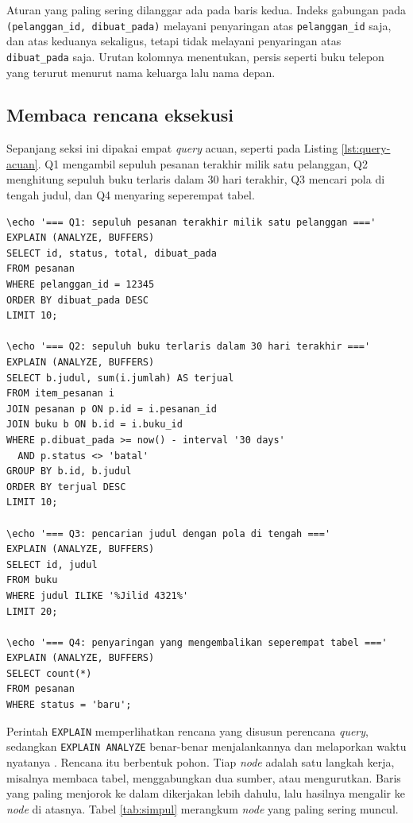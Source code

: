 Aturan yang paling sering dilanggar ada pada baris kedua. Indeks gabungan pada
\texttt{(pelanggan\_id, dibuat\_pada)} melayani penyaringan atas
\texttt{pelanggan\_id} saja, dan atas keduanya sekaligus, tetapi tidak melayani
penyaringan atas \texttt{dibuat\_pada} saja. Urutan kolomnya menentukan, persis
seperti buku telepon yang terurut menurut nama keluarga lalu nama depan.

\subsection*{Membaca rencana eksekusi}

Sepanjang seksi ini dipakai empat \textit{query} acuan, seperti pada Listing
\ref{lst:query-acuan}. Q1 mengambil sepuluh pesanan terakhir milik satu
pelanggan, Q2 menghitung sepuluh buku terlaris dalam 30 hari terakhir, Q3
mencari pola di tengah judul, dan Q4 menyaring seperempat tabel.

\begin{lstlisting}[style=SqlStyle, caption={Empat query acuan yang dipakai sepanjang bab ini, tersedia di \berkas{sources/chapter03/03-query-baseline.sql}}, label={lst:query-acuan}]
\echo '=== Q1: sepuluh pesanan terakhir milik satu pelanggan ==='
EXPLAIN (ANALYZE, BUFFERS)
SELECT id, status, total, dibuat_pada
FROM pesanan
WHERE pelanggan_id = 12345
ORDER BY dibuat_pada DESC
LIMIT 10;

\echo '=== Q2: sepuluh buku terlaris dalam 30 hari terakhir ==='
EXPLAIN (ANALYZE, BUFFERS)
SELECT b.judul, sum(i.jumlah) AS terjual
FROM item_pesanan i
JOIN pesanan p ON p.id = i.pesanan_id
JOIN buku b ON b.id = i.buku_id
WHERE p.dibuat_pada >= now() - interval '30 days'
  AND p.status <> 'batal'
GROUP BY b.id, b.judul
ORDER BY terjual DESC
LIMIT 10;

\echo '=== Q3: pencarian judul dengan pola di tengah ==='
EXPLAIN (ANALYZE, BUFFERS)
SELECT id, judul
FROM buku
WHERE judul ILIKE '%Jilid 4321%'
LIMIT 20;

\echo '=== Q4: penyaringan yang mengembalikan seperempat tabel ==='
EXPLAIN (ANALYZE, BUFFERS)
SELECT count(*)
FROM pesanan
WHERE status = 'baru';
\end{lstlisting}

Perintah \texttt{EXPLAIN} memperlihatkan rencana yang disusun perencana \textit{query},
sedangkan \texttt{EXPLAIN ANALYZE} benar-benar menjalankannya dan melaporkan
waktu nyatanya \cite{pgdoc-explain}. Rencana itu berbentuk pohon. Tiap
\textit{node} adalah satu langkah kerja, misalnya membaca tabel, menggabungkan
dua sumber, atau mengurutkan. Baris yang paling menjorok ke dalam dikerjakan
lebih dahulu, lalu hasilnya mengalir ke \textit{node} di atasnya. Tabel
\ref{tab:simpul} merangkum \textit{node} yang paling sering muncul.

